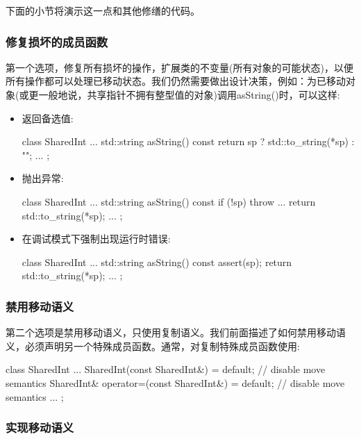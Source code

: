 下面的小节将演示这一点和其他修缮的代码。

\subsubsection{修复损坏的成员函数}

第一个选项，修复所有损坏的操作，扩展类的不变量(所有对象的可能状态)，以便所有操作都可以处理已移动状态。我们仍然需要做出设计决策，例如：为已移动对象(或更一般地说，共享指针不拥有整型值的对象)调用asString()时，可以这样:

\begin{itemize}
	\item 返回备选值:

	\begin{cppcode}
class SharedInt {
	...
	std::string asString() const {
		return sp ? std::to_string(*sp) : "";
	}
	...
};
	\end{cppcode}
	\item 抛出异常:

	\begin{cppcode}
class SharedInt {
	...
	std::string asString() const {
		if (!sp) throw ...
		return std::to_string(*sp);
	}
	...
};
	\end{cppcode}
	\item 在调试模式下强制出现运行时错误:

	\begin{cppcode}
class SharedInt {
	...
	std::string asString() const {
		assert(sp);
		return std::to_string(*sp);
	}
	...
};
	\end{cppcode}
\end{itemize}

\subsubsection{禁用移动语义}

第二个选项是禁用移动语义，只使用复制语义。我们前面描述了如何禁用移动语义，必须声明另一个特殊成员函数。通常，对复制特殊成员函数使用:

\begin{cppcode}
class SharedInt {
	...
	SharedInt(const SharedInt&) = default; // disable move semantics
	SharedInt& operator=(const SharedInt&) = default; // disable move semantics
	...
};
\end{cppcode}

\subsubsection{实现移动语义}

